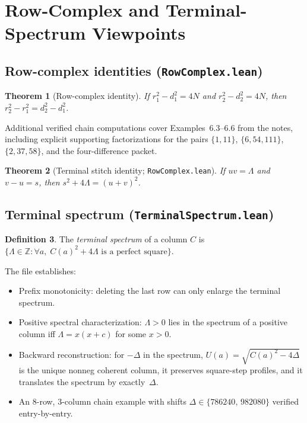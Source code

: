 \documentclass[11pt,a4paper]{article}
\newtheorem{theorem}{Theorem}[section]
\theoremstyle{definition}
\newtheorem{definition}[theorem]{Definition}
\theoremstyle{remark}
\newcommand{\ZZ}{\mathbb{Z}}
\begin{document}
\section{Row-Complex and Terminal-Spectrum Viewpoints}\label{sec:rowcomplex}

\subsection{Row-complex identities (\texttt{RowComplex.lean})}

\begin{theorem}[Row-complex identity]
If $r_1^2-d_1^2=4N$ and $r_2^2-d_2^2=4N$, then
$r_2^2-r_1^2 = d_2^2-d_1^2$.
\end{theorem}

Additional verified chain computations cover Examples~6.3--6.6 from the
notes, including explicit supporting factorizations for the pairs
$\{1,11\}$, $\{6,54,111\}$, $\{2,37,58\}$, and the four-difference
packet.

\begin{theorem}[Terminal stitch identity; \texttt{RowComplex.lean}]
If $uv=\Lambda$ and $v-u=s$, then $s^2+4\Lambda = (u+v)^2$.
\end{theorem}

\subsection{Terminal spectrum (\texttt{TerminalSpectrum.lean})}

\begin{definition}
The \emph{terminal spectrum} of a column $C$ is
$\{\Lambda\in\ZZ : \forall a,\; C(a)^2+4\Lambda \text{ is a perfect square}\}$.
\end{definition}

The file establishes:
\begin{itemize}[nosep]
\item Prefix monotonicity: deleting the last row can only enlarge the
      terminal spectrum.
\item Positive spectral characterization: $\Lambda>0$ lies in the
      spectrum of a positive column iff $\Lambda=x(x+c)$ for some $x>0$.
\item Backward reconstruction: for $-\Delta$ in the spectrum,
      $U(a)=\sqrt{C(a)^2-4\Delta}$ is the unique nonneg coherent column,
      it preserves square-step profiles, and it translates the spectrum by
      exactly~$\Delta$.
\item An $8$-row, $3$-column chain example with shifts
      $\Delta\in\{786240,\,982080\}$ verified entry-by-entry.
\end{itemize}
\end{document}
